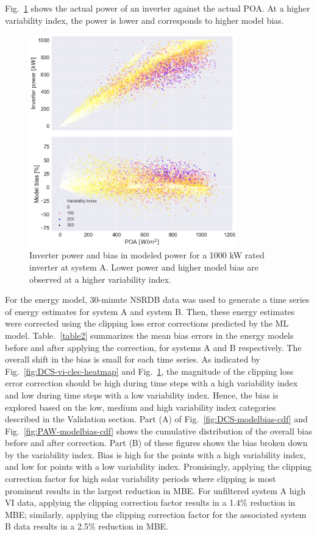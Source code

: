 \documentclass[conference]{IEEEtran}
\begin{document}
Fig.~\ref{fig:DCS-inv-modelbias-poa-scatter} shows the actual power of an inverter against the actual POA. At a higher variability index, the power is lower and corresponds to higher model bias.

\begin{figure}[htbp]
\centerline{\includegraphics[width=9cm]{DCS_Inv_ModelBias_POA_with_VI.png}}
\caption{Inverter power and bias in modeled power for a 1000 kW rated inverter at system A. Lower power and higher model bias are observed at a higher variability index.}
\label{fig:DCS-inv-modelbias-poa-scatter}
\end{figure}

For the energy model, 30-minute NSRDB data was used to generate a time series of energy estimates for system A and system B. Then, these energy estimates were corrected using the clipping loss error corrections predicted by the ML model. Table.~\ref{table2} summarizes the mean bias errors in the energy models before and after applying the correction, for systems A and B respectively. The overall shift in the bias is small for each time series. As indicated by Fig.~\ref{fig:DCS-vi-clec-heatmap} and Fig.~\ref{fig:DCS-inv-modelbias-poa-scatter}, the magnitude of the clipping loss error correction should be high during time steps with a high variability index and low during time steps with a low variability index. Hence, the bias is explored based on the low, medium and high variability index categories described in the Validation section. Part (A) of Fig.~\ref{fig:DCS-modelbias-cdf} and Fig.~\ref{fig:PAW-modelbias-cdf} shows the cumulative distribution of the overall bias before and after correction. Part (B) of these figures shows the bias broken down by the variability index. Bias is high for the points with a high variability index, and low for points with a low variability index.  Promisingly, applying the clipping correction factor for high solar variability periods where clipping is most prominent results in the largest reduction in MBE. For unfiltered system A high VI data, applying the clipping correction factor results in a 1.4\% reduction in MBE; similarly, applying the clipping correction factor for the associated system B data results in a 2.5\% reduction in MBE.
\end{document}
